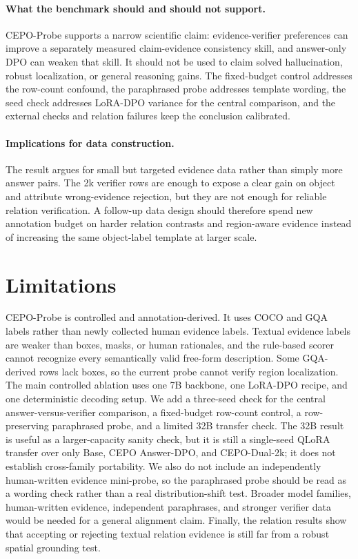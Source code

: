 \documentclass[10pt,twocolumn,letterpaper]{article}
\newcommand{\benchmark}{CEPO-Probe}
\newcommand{\answerdpo}{CEPO Answer-DPO}
\newcommand{\dualtwok}{CEPO-Dual-2k}
\begin{document}
\paragraph{What the benchmark should and should not support.}
\benchmark{} supports a narrow scientific claim: evidence-verifier
preferences can improve a separately measured claim-evidence consistency
skill, and answer-only DPO can weaken that skill. It should not be used to
claim solved hallucination, robust localization, or general reasoning gains.
The fixed-budget control addresses the row-count confound, the paraphrased
probe addresses template wording, the seed check addresses LoRA-DPO variance
for the central comparison, and the external checks and relation failures keep
the conclusion calibrated.

\paragraph{Implications for data construction.}
The result argues for small but targeted evidence data rather than simply more
answer pairs. The 2k verifier rows are enough to expose a clear gain on object
and attribute wrong-evidence rejection, but they are not enough for reliable
relation verification. A follow-up data design should therefore spend new
annotation budget on harder relation contrasts and region-aware evidence
instead of increasing the same object-label template at larger scale.

\section{Limitations}

\benchmark{} is controlled and annotation-derived. It uses COCO and GQA
labels rather than newly collected human evidence labels. Textual evidence
labels are weaker than boxes, masks, or human rationales, and the rule-based
scorer cannot recognize every semantically valid free-form description. Some
GQA-derived rows lack boxes, so the current probe cannot verify region
localization. The main controlled ablation uses one 7B backbone, one LoRA-DPO
recipe, and one deterministic decoding setup. We add a three-seed check for
the central answer-versus-verifier comparison, a fixed-budget row-count control,
a row-preserving paraphrased probe, and a limited 32B transfer check. The 32B
result is useful as a larger-capacity sanity check, but it is still a
single-seed QLoRA transfer over only Base, \answerdpo{}, and \dualtwok{};
it does not establish cross-family portability. We also do not include an
independently human-written evidence mini-probe, so the paraphrased probe
should be read as a wording check rather than a real distribution-shift test.
Broader model families, human-written evidence, independent paraphrases, and
stronger verifier data would be needed for a general alignment claim. Finally,
the relation results show that accepting or rejecting textual relation evidence
is still far from a robust spatial grounding test.
\end{document}

